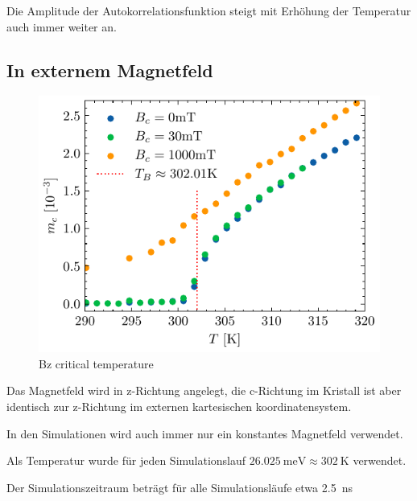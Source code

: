 \documentclass[main.tex]{subfiles}
\begin{document}
Die Amplitude der Autokorrelationsfunktion steigt mit Erhöhung der Temperatur auch immer weiter an.

\subsection{In externem Magnetfeld}


\begin{figure}[H]
    \centering
    \includegraphics{bilder/plots/Bz_comparison/critical_temperature.pdf}
    \caption{Bz critical temperature}\label{fig:bz-crit-temp}
\end{figure}




Das Magnetfeld wird in z-Richtung angelegt, die c-Richtung im Kristall ist aber identisch zur z-Richtung im externen kartesischen koordinatensystem.

In den Simulationen wird auch immer nur ein konstantes Magnetfeld verwendet.

Als Temperatur wurde für jeden Simulationslauf \( \SI{26.025}{\milli\electronvolt} \approx \SI{302}{\kelvin}\) verwendet.

Der Simulationszeitraum beträgt für alle Simulationsläufe etwa \SI{2.5}{\nano\s}
\end{document}
